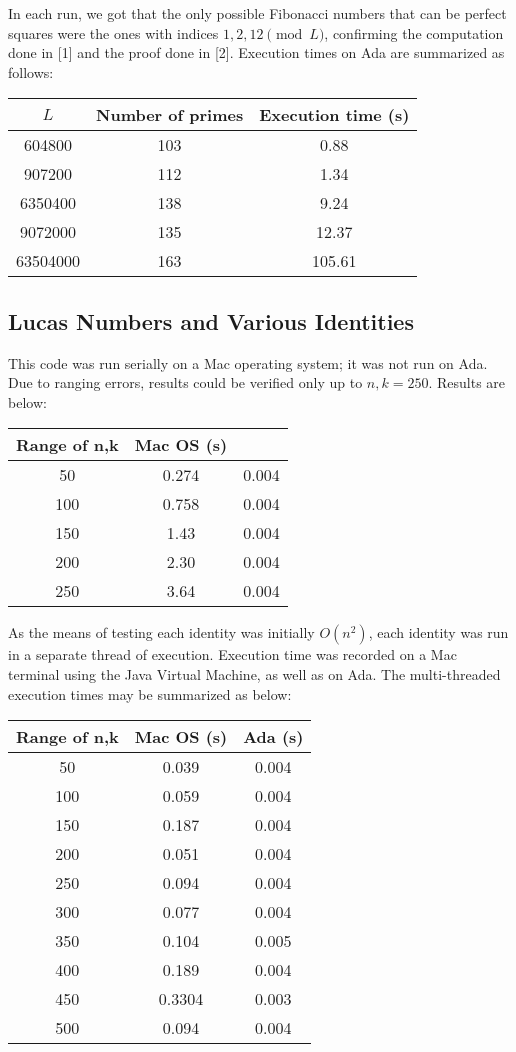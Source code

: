 \documentclass[11pt]{article}
\begin{document}
In each run, we got that the only possible Fibonacci numbers that can be perfect squares were the ones with indices $1, 2, 12 \pmod{L}$, confirming the computation done in [1] and the proof done in [2]. Execution times on Ada are summarized as follows:

\begin{tabular}{ccc}
\hline
$L$ & Number of primes & Execution time (s) \\ \hline
604800 & 103 & 0.88 \\
907200 & 112 & 1.34 \\
6350400 & 138 & 9.24 \\
9072000 & 135 & 12.37 \\
63504000 & 163 & 105.61 \\ \hline \hline
\end{tabular}

\subsection{Lucas Numbers and Various Identities}
This code was run serially on a Mac operating system; it was not run on Ada. Due to ranging errors, results could be verified only up to $n,k=250$. Results are below:
\begin{tabular}{ccc}
\hline
 Range of n,k & Mac OS (s)  \\ \hline
50 & 0.274 & 0.004\\
100 & 0.758 & 0.004 \\
150 & 1.43 & 0.004 \\
200 & 2.30 & 0.004 \\
250 & 3.64 & 0.004 \\ 
\hline \hline
\end{tabular}
As the means of testing each identity was initially $O(n^{2})$, each identity was run in a separate thread of execution. Execution time was recorded on a Mac terminal using the Java Virtual Machine, as well as on Ada. The multi-threaded execution times may be summarized as below:\\
\begin{tabular}{ccc}
\hline
 Range of n,k & Mac OS (s) & Ada (s) \\ \hline
50 & 0.039 & 0.004\\
100 & 0.059 & 0.004 \\
150 & 0.187 & 0.004 \\
200 & 0.051 & 0.004 \\
250 & 0.094 & 0.004 \\ 
300 & 0.077 & 0.004 \\
350 & 0.104 & 0.005 \\
400 & 0.189 & 0.004 \\
450 & 0.3304 & 0.003 \\
500 & 0.094 &0.004 \\ \hline \hline
\end{tabular}
\end{document}
